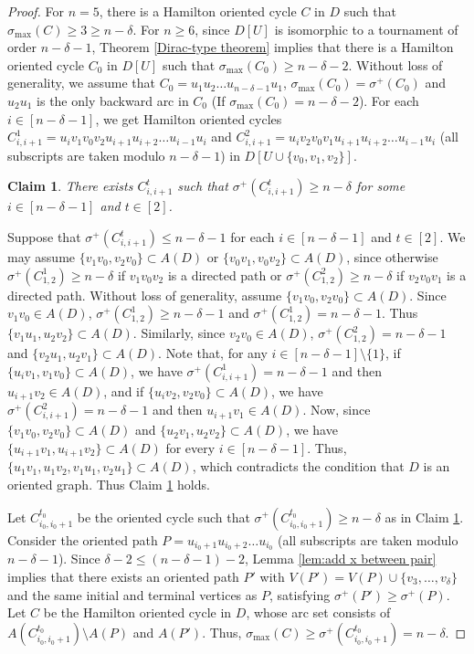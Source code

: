 \documentclass[11pt]{article}
\newtheorem{claim}{Claim}
\newcommand{\QGr}[1]{{#1}}
\newcommand{\YLn}[1]{{#1}}
\newcommand{\2}{\vspace{0.2cm}}
\begin{document}
\begin{proof}
		For $n=5$, there is a Hamilton oriented cycle $C$ in $D$ such that $\sigma_{\max}(C)\ge 3\ge n-\delta$. For $n\ge 6$, since  $D[U]$ is isomorphic to a tournament of order $n-\delta -1$, Theorem \ref{Dirac-type theorem} implies that there is a Hamilton oriented cycle $C_0$ in $D[U]$ such that $\sigma_{\max}(C_0)\ge n-\delta -2$. Without loss of generality, we assume that $C_0 = u_1u_2\ldots u_{n-\delta -1}u_1$, $\sigma_{\max}(C_0) = \sigma^{+}(C_0)$ and $u_2u_1$ is the only backward arc in $C_0$ (If $\sigma_{\max}(C_0)= n-\delta -2$). For each $i\in [n-\delta -1]$, we get Hamilton oriented cycles $C^1_{i,i+1}=u_iv_1v_0v_2u_{i+1}u_{i+2}\dots u_{i-1}u_i$ and $C^2_{i,i+1}=u_iv_2v_0v_1u_{i+1}u_{i+2}\dots u_{i-1}u_i$ (all subscripts are taken modulo $n-\delta -1$)  in $D[U\cup \{v_0,v_1,v_2\}]$.
		\begin{claim}\label{claim_1}
			\YLn{There exists $C^t_{i,i+1}$ such that $\sigma^+(C^t_{i,i+1})\ge n-\delta$ for some $i\in [n-\delta -1]$ and $t\in [2]$}.
		\end{claim}
		Suppose that $\sigma^+(C^t_{i,i+1}) \le n-\delta -1$ for each $i\in [n-\delta -1]$ and $t\in [2]$. We may assume $\{v_1v_0,v_2v_0\}\subset A(D)$ or $\{v_0v_1,v_0v_2\}\subset A(D)$, since otherwise $\sigma^+(C^1_{1,2}) \ge n-\delta$  if $v_1v_0v_2$ is a directed path or $\sigma^+(C^2_{1,2}) \ge n-\delta$ if $v_2v_0v_1$ is a directed path. Without loss of generality, assume $\{v_1v_0,v_2v_0\}\subset A(D)$. Since $v_1v_0\in A(D)$, $ \sigma^+(C^1_{1,2}) \ge n-\delta -1$ and $ \sigma^+(C^1_{1,2}) = n-\delta -1$. Thus $\{v_1u_1, u_2v_2\}\subset A(D)$. Similarly, since $v_2v_0\in A(D)$, $\sigma^+(C^2_{1,2}) = n-\delta -1$ and $\{v_2u_1, u_2v_1\}\subset A(D)$. \QGr{Note that, for any $i\in [n-\delta -1]\setminus\{1\}$, if $\{u_iv_1, v_1v_0\} \subset A(D)$, we have $ \sigma^+(C^1_{i,i+1}) = n-\delta -1$ and then $u_{i+1}v_2\in A(D)$, and  if  $\{u_iv_2, v_2v_0\} \subset A(D)$, we have $ \sigma^+(C^2_{i,i+1}) = n-\delta -1$ and then $u_{i+1}v_1\in A(D)$. Now, since $\{v_1v_0,v_2v_0\}\subset A(D)$ and $\{u_2v_1, u_2v_2\}\subset A(D)$,} we have $\{u_{i+1}v_1,u_{i+1}v_2\}\subset A(D)$ for every $i\in [n-\delta -1]$. Thus, $\{u_1v_1,u_1v_2,v_1u_1, v_2u_1\}\subset A(D)$, which contradicts the condition that $D$ is an oriented graph. Thus Claim \ref{claim_1} holds.
		\vspace{0.5cm}
		
        Let $C^{t_0}_{i_0,i_0+1}$ be the oriented cycle such that $\sigma^+(C^{t_0}_{i_0,i_0+1})\ge n-\delta$ as in Claim \ref{claim_1}. Consider the oriented path $P=u_{i_0+1}u_{i_0+2}\dots u_{i_0}$ (all subscripts are taken modulo $n-\delta-1$). Since $\delta-2 \le (n-\delta -1) -2$, Lemma \ref{lem:add x between pair} implies that there exists an oriented path $P'$ with $V(P')=V(P)\cup \{v_3,\dots,v_{\delta}\}$ and the same initial and terminal vertices as $P$, satisfying $\sigma^+(P') \ge \sigma^+(P)$. Let $C$ be the Hamilton oriented cycle in $D$, whose arc set consists of $A(C^{t_0}_{i_0,i_0+1})\setminus A(P)$ and $A(P')$. Thus, $\sigma_{\max}(C)\ge \sigma^+(C^{t_0}_{i_0,i_0+1})=n-\delta$.
        \end{proof}
\end{document}
